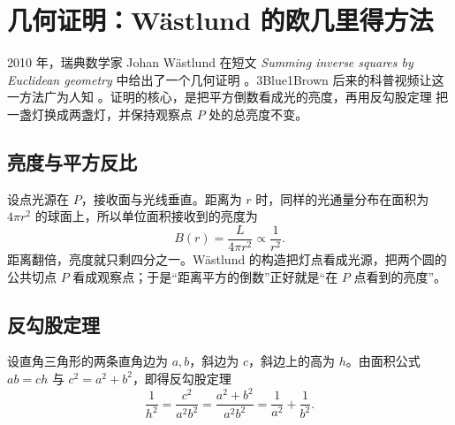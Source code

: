 \section{几何证明：Wästlund 的欧几里得方法}

2010 年，瑞典数学家 Johan Wästlund 在短文
\emph{Summing inverse squares by Euclidean geometry} 中给出了一个几何证明
\cite{wastlund}。3Blue1Brown 后来的科普视频让这一方法广为人知
\cite{threeblueonebrown}。证明的核心，是把平方倒数看成光的亮度，再用反勾股定理
把一盏灯换成两盏灯，并保持观察点 $P$ 处的总亮度不变。

\subsection{亮度与平方反比}

设点光源在 $P$，接收面与光线垂直。距离为 $r$ 时，同样的光通量分布在面积为
$4\pi r^2$ 的球面上，所以单位面积接收到的亮度为
\begin{equation}
  B(r)=\frac{L}{4\pi r^2}\propto\frac{1}{r^2}.
  \label{eq:inverse-square}
\end{equation}
距离翻倍，亮度就只剩四分之一。Wästlund 的构造把灯点看成光源，把两个圆的公共切点
$P$ 看成观察点；于是“距离平方的倒数”正好就是“在 $P$ 点看到的亮度”。

\subsection{反勾股定理}

设直角三角形的两条直角边为 $a,b$，斜边为 $c$，斜边上的高为 $h$。由面积公式
$ab=ch$ 与 $c^2=a^2+b^2$，即得反勾股定理
\begin{equation}
  \frac{1}{h^2}
  =\frac{c^2}{a^2b^2}
  =\frac{a^2+b^2}{a^2b^2}
  =\frac{1}{a^2}+\frac{1}{b^2}.
  \label{eq:inverse-pythagoras}
\end{equation}

